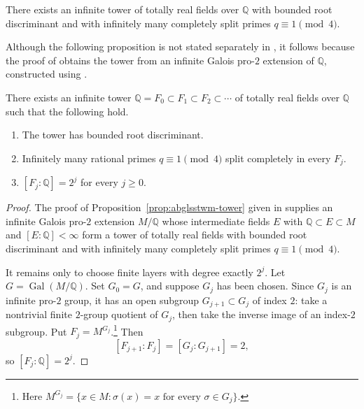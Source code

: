 \begin{proposition}\label{prop:abglsstwm-tower}
There exists an infinite tower of totally real fields over \(\mathbb Q\) with bounded root discriminant and with infinitely many completely split primes \(q\equiv1\pmod4\).
\end{proposition}

Although the following proposition is not stated separately in \cite{ABGLSSTWM26}, it follows because the proof of \cite[Proposition~2.3]{ABGLSSTWM26} obtains the tower from an infinite Galois pro-\(2\) extension of \(\mathbb Q\), constructed using \cite[Theorem~2.8 of the arXiv version, or Theorem~4 of the published version]{HMR21}.

\begin{proposition}\label{prop:tower}
There exists an infinite tower \(\mathbb Q=F_0\subset F_1\subset F_2\subset\cdots\) of totally real fields over \(\mathbb Q\) such that the following hold.
\begin{enumerate}
\item The tower has bounded root discriminant.
\item Infinitely many rational primes \(q\equiv1\pmod4\) split completely in every \(F_j\).
\item \([F_j:\mathbb Q]=2^j\) for every \(j\ge0\).
\end{enumerate}
\end{proposition}

\begin{proof}
The proof of Proposition~\ref{prop:abglsstwm-tower} given in \cite{ABGLSSTWM26} supplies an infinite Galois pro-\(2\) extension \(M/\mathbb Q\) whose intermediate fields \(E\) with \(\mathbb Q\subset E\subset M\) and \([E:\mathbb Q]<\infty\) form a tower of totally real fields with bounded root discriminant and with infinitely many completely split primes \(q\equiv1\pmod4\).

It remains only to choose finite layers with degree exactly \(2^j\).
Let \(G=\operatorname{Gal}(M/\mathbb Q)\).
Set \(G_0=G\), and suppose \(G_j\) has been chosen.
Since \(G_j\) is an infinite pro-\(2\) group, it has an open subgroup \(G_{j+1}\subset G_j\) of index \(2\): take a nontrivial finite \(2\)-group quotient of \(G_j\), then take the inverse image of an index-\(2\) subgroup.
Put \(F_j=M^{G_j}\).\footnote{Here \(M^{G_j}=\{x\in M:\sigma(x)=x\text{ for every }\sigma\in G_j\}\).}
Then
\[
[F_{j+1}:F_j]=[G_j:G_{j+1}]=2,
\]
so \([F_j:\mathbb Q]=2^j\).
\end{proof}


